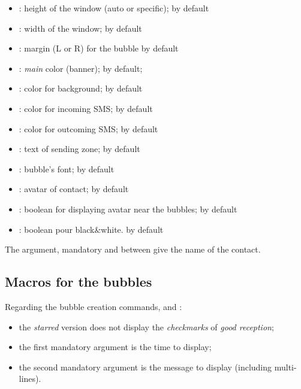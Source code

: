 \documentclass[english,11pt,a4paper]{article}
\begin{document}
\begin{itemize}
	\item {}: height of the window (auto or specific);  by default
	\item {}: width of the window; \MontreCode{7cm} by default
	\item {}: margin (L or R) for the bubble \MontreCode{1.5cm} by default
	\item {}: \textit{main} color (banner);  by default;
	\item {}: color for background;  by default
	\item {}: color for incoming SMS;  by default
	\item {}: color for outcoming SMS;  by default
	\item {}: text of sending zone;  by default
	\item {}: bubble's font;  by default
	\item {}: avatar of contact;  by default
	\item {}: boolean for displaying avatar near the bubbles;  by default
	\item {}: boolean pour black\&white.  by default
\end{itemize}

The argument, mandatory and between  give the name of the contact.

\subsection{Macros for the bubbles}

Regarding the bubble creation commands,  and :

\begin{itemize}
	\item the \textit{starred} version does not display the \textit{checkmarks} of \textit{good reception};
	\item the first mandatory argument is the time to display;
	\item the second mandatory argument is the message to display (including multi-lines).
\end{itemize}
\end{document}
